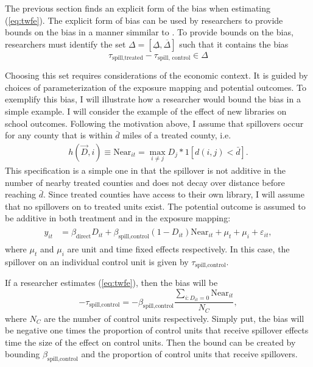 \documentclass[11pt]{article}
\begin{document}
The previous section finds an explicit form of the bias when estimating (\ref{eq:twfe}). The explicit form of bias can be used by researchers to provide bounds on the bias in a manner simmilar to \citet{Rambachan_Roth_2020}. To provide bounds on the bias, researchers must identify the set $\Delta = [\underline{\Delta}, \overline{\Delta}]$ such that it contains the bias \[ 
    \tau_{\text{spill,treated}} - \tau_{\text{spill, control}} \in \Delta
\]

Choosing this set requires considerations of the economic context. It is guided by choices of parameterization of the exposure mapping and potential outcomes. To exemplify this bias, I will illustrate how a researcher would bound the bias in a simple example. I will consider the example of the effect of new libraries on school outcomes. Following the motivation above, I assume that spillovers occur for any county that is within $\bar{d}$ miles of a treated county, i.e. 
\begin{align}
    \label{eq:example_exposure}
    h(\vec{D}, i) \equiv \text{Near}_{it} = \max_{i \neq j} D_j * 1[ d(i,j) < \bar{d} ].
\end{align}
This specification is a simple one in that the spillover is not additive in the number of nearby treated counties and does not decay over distance before reaching $\bar{d}$. Since treated counties have access to their own library, I will assume that no spillovers on to treated units exist. The potential outcome is assumed to be additive in both treatment and in the exposure mapping:
\begin{align}
    \label{eq:example_po}
    \begin{split}
        y_{it} &= \beta_{\text{direct}} D_{it} + \beta_{\text{spill,control}} (1-D_{it}) \text{Near}_{it} + \mu_t + \mu_i + \varepsilon_{it},
    \end{split}
\end{align}
where $\mu_t$ and $\mu_i$ are unit and time fixed effects respectively. In this case, the spillover on an individual control unit is given by $\tau_{\text{spill,control}}$. 

If a researcher estimates (\ref{eq:twfe}), then the bias will be \[ 
    - \tau_{\text{spill,control}} = - \beta_{\text{spill,control}} \frac{\sum_{i: D_{it} = 0} \text{Near}_{it}}{N_C},
\] 
where $N_C$ are the number of control units respectively. Simply put, the bias will be negative one times the proportion of control units that receive spillover effects time the size of the effect on control units. Then the bound can be created by bounding $\beta_{\text{spill,control}}$ and the proportion of control units that receive spillovers.
\end{document}
